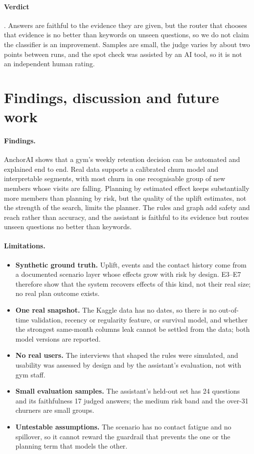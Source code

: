 \documentclass[paper=a4, fontsize=11pt, open=any, parskip=half-,
  headings=small, numbers=noenddot, captions=tableheading, toc=flat]{scrreprt}
\begin{document}
\paragraph{Verdict} . Answers are faithful to the evidence they are given, but the router that chooses that evidence is no better than keywords on unseen questions, so we do not claim the classifier is an improvement. Samples are small, the judge varies by about two points between runs, and the spot check was assisted by an AI tool, so it is not an independent human rating.

\FloatBarrier
\section{Findings, discussion and future work}
\label{sec:conclusions}

\paragraph{Findings.} AnchorAI shows that a gym's weekly retention decision can be automated and explained end to end. Real data supports a calibrated churn model and interpretable segments, with most churn in one recognisable group of new members whose visits are falling. Planning by estimated effect keeps substantially more members than planning by risk, but the quality of the uplift estimates, not the strength of the search, limits the planner. The rules and graph add safety and reach rather than accuracy, and the assistant is faithful to its evidence but routes unseen questions no better than keywords.

\paragraph{Limitations.}
\begin{itemize}
  \item \textbf{Synthetic ground truth.} Uplift, events and the contact history come from a documented scenario layer whose effects grow with risk by design. E3--E7 therefore show that the system recovers effects of this kind, not their real size; no real plan outcome exists.
  \item \textbf{One real snapshot.} The Kaggle data has no dates, so there is no out-of-time validation, recency or regularity feature, or survival model, and whether the strongest same-month columns leak cannot be settled from the data; both model versions are reported.
  \item \textbf{No real users.} The interviews that shaped the rules were simulated, and usability was assessed by design and by the assistant's evaluation, not with gym staff.
  \item \textbf{Small evaluation samples.} The assistant's held-out set has 24 questions and its faithfulness 17 judged answers; the medium risk band and the over-31 churners are small groups.
  \item \textbf{Untestable assumptions.} The scenario has no contact fatigue and no spillover, so it cannot reward the guardrail that prevents the one or the planning term that models the other.
\end{itemize}
\end{document}
